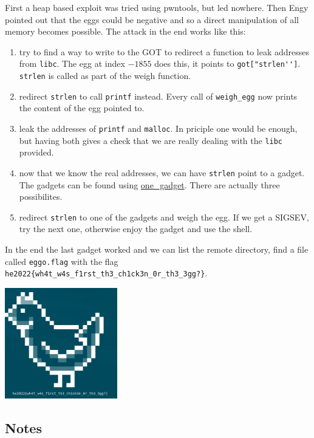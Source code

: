 \noindent First a heap based exploit was tried using pwntools, but led nowhere.
Then Engy pointed out that the eggs could be negative and so a direct
manipulation of all memory becomes possible.  The attack in the end works like
this:

\begin{enumerate}
\item try to find a way to write to the GOT to redirect a function to leak
	addresses from \verb+libc+.  The egg at index $-1855$ does this, it
	points to \verb+got["strlen'']+.  \verb+strlen+ is called as part of
	the weigh function.
\item redirect \verb+strlen+ to call \verb+printf+ instead.  Every call of
	\verb+weigh_egg+ now prints the content of the egg pointed to.
\item leak the addresses of \verb+printf+ and \verb+malloc+.  In priciple one
	would be enough, but having both gives a check that we are really
	dealing with the \verb+libc+ provided.
\item now that we know the real addresses, we can have \verb+strlen+ point to a
	gadget.  The gadgets can be found using
	\href{https://github.com/david942j/one_gadget}{one\_gadget}.  There are
	actually three possibilites.
\item redirect \verb+strlen+ to one of the gadgets and weigh the egg.  If we
	get a SIGSEV, try the next one, otherwise enjoy the gadget and use the
	shell.
\end{enumerate}

In the end the last gadget worked and we can list the remote directory, find a
file called \verb+eggo.flag+ with the flag\\
\noindent
\verb+he2022{wh4t_w4s_f1rst_th3_ch1ck3n_0r_th3_3gg?}+.

\begin{marginfigure}
	\includegraphics[width=49mm]{level8/egg37.png}
\end{marginfigure}

\subsection{Notes}

